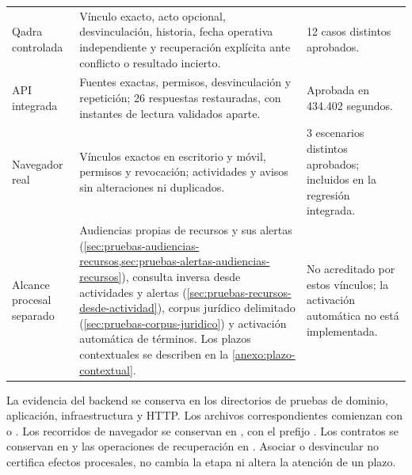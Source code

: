 \begin{longtable}{@{}L{3.2cm} L{7.6cm} L{4.6cm}@{}}
  \addlinespace
  Qadra controlada & Vínculo exacto, acto opcional, desvinculación, historia, fecha operativa independiente y recuperación explícita ante conflicto o resultado incierto. & 12 casos distintos aprobados. \\
  \addlinespace
  API integrada & Fuentes exactas, permisos, desvinculación y repetición; 26 respuestas restauradas, con instantes de lectura validados aparte. & Aprobada en 434.402 segundos. \\
  \addlinespace
  Navegador real & Vínculos exactos en escritorio y móvil, permisos y revocación; actividades y avisos sin alteraciones ni duplicados. & 3 escenarios distintos aprobados; incluidos en la regresión integrada. \\
  \addlinespace
  Alcance procesal separado & Audiencias propias de recursos y sus alertas (\cref{sec:pruebas-audiencias-recursos,sec:pruebas-alertas-audiencias-recursos}), consulta inversa desde actividades y alertas (\cref{sec:pruebas-recursos-desde-actividad}), corpus jurídico delimitado (\cref{sec:pruebas-corpus-juridico}) y activación automática de términos. Los plazos contextuales se describen en la \cref{anexo:plazo-contextual}. & No acreditado por estos vínculos; la activación automática no está implementada. \\
\end{longtable}

La evidencia del backend se conserva en los directorios de pruebas de dominio, aplicación, infraestructura y HTTP. Los archivos correspondientes comienzan con  o . Los recorridos de navegador se conservan en , con el prefijo . Los contratos se conservan en  y las operaciones de recuperación en . Asociar o desvincular no certifica efectos procesales, no cambia la etapa ni altera la atención de un plazo.
